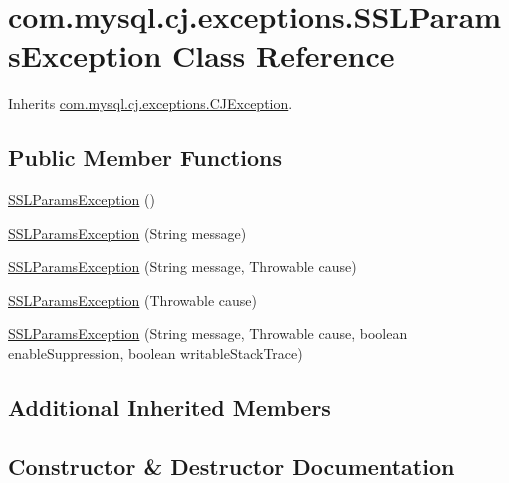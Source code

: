 \hypertarget{classcom_1_1mysql_1_1cj_1_1exceptions_1_1_s_s_l_params_exception}{}\section{com.\+mysql.\+cj.\+exceptions.\+S\+S\+L\+Params\+Exception Class Reference}
\label{classcom_1_1mysql_1_1cj_1_1exceptions_1_1_s_s_l_params_exception}


Inherits \mbox{\hyperlink{classcom_1_1mysql_1_1cj_1_1exceptions_1_1_c_j_exception}{com.\+mysql.\+cj.\+exceptions.\+C\+J\+Exception}}.

\subsection*{Public Member Functions}
\begin{DoxyCompactItemize}
\item 
\mbox{\hyperlink{classcom_1_1mysql_1_1cj_1_1exceptions_1_1_s_s_l_params_exception_aa8f07a481d4f63c4f8b86f5b895ed4a2}{S\+S\+L\+Params\+Exception}} ()
\item 
\mbox{\hyperlink{classcom_1_1mysql_1_1cj_1_1exceptions_1_1_s_s_l_params_exception_a752de2699be84a20ae7aa974f57611b7}{S\+S\+L\+Params\+Exception}} (String message)
\item 
\mbox{\hyperlink{classcom_1_1mysql_1_1cj_1_1exceptions_1_1_s_s_l_params_exception_aa0c6ca68d7e7fd39b7c4d849550d70b5}{S\+S\+L\+Params\+Exception}} (String message, Throwable cause)
\item 
\mbox{\hyperlink{classcom_1_1mysql_1_1cj_1_1exceptions_1_1_s_s_l_params_exception_a5ae440bf6edff626b09447c640137a2a}{S\+S\+L\+Params\+Exception}} (Throwable cause)
\item 
\mbox{\hyperlink{classcom_1_1mysql_1_1cj_1_1exceptions_1_1_s_s_l_params_exception_ae970e7affea01534eaa4e74e94f59a3b}{S\+S\+L\+Params\+Exception}} (String message, Throwable cause, boolean enable\+Suppression, boolean writable\+Stack\+Trace)
\end{DoxyCompactItemize}
\subsection*{Additional Inherited Members}


\subsection{Constructor \& Destructor Documentation}
\mbox{\label{classcom_1_1mysql_1_1cj_1_1exceptions_1_1_s_s_l_params_exception_aa8f07a481d4f63c4f8b86f5b895ed4a2}} 
